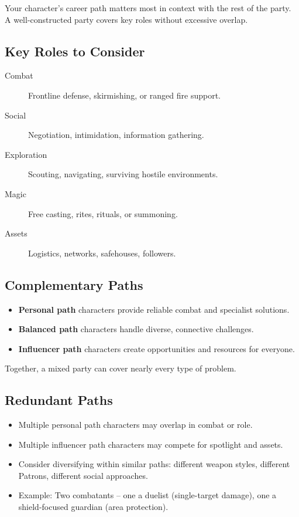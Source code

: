 Your character's career path matters most in context with the rest of the
party. A well-constructed party covers key roles without excessive overlap.

\subsection*{Key Roles to Consider}
\begin{description}
\item[Combat] Frontline defense, skirmishing, or ranged fire support.
\item[Social] Negotiation, intimidation, information gathering.
\item[Exploration] Scouting, navigating, surviving hostile environments.
\item[Magic] Free casting, rites, rituals, or summoning.
\item[Assets] Logistics, networks, safehouses, followers.
\end{description}

\subsection*{Complementary Paths}
\begin{itemize}
\item \textbf{Personal path} characters provide reliable combat and specialist solutions.
\item \textbf{Balanced path} characters handle diverse, connective challenges.
\item \textbf{Influencer path} characters create opportunities and resources for everyone.
\end{itemize}
Together, a mixed party can cover nearly every type of problem.

\subsection*{Redundant Paths}
\begin{itemize}
\item Multiple personal path characters may overlap in combat or role.
\item Multiple influencer path characters may compete for spotlight and assets.
\item Consider diversifying within similar paths: different weapon styles, different Patrons, different social approaches.
\item Example: Two combatants -- one a duelist (single-target damage), one a shield-focused guardian (area protection).
\end{itemize}

